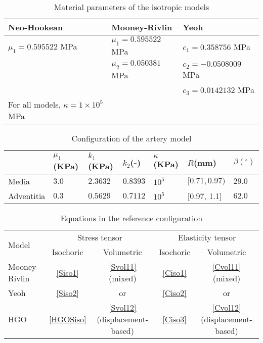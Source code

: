 \begin{table}
\centering
\caption{Material parameters of the isotropic models}
\begin{tabular} { l  l  l }
	\hline
	Neo-Hookean & Mooney-Rivlin & Yeoh \\
	\hline
	$\mu_1 = 0.595522$ MPa & $\mu_1 = 0.595522$ MPa & $c_1 = 0.358756$ MPa \\
	& $\mu_2 = 0.050381$ MPa & $c_2 = - 0.0508009$ MPa \\
	& & $c_3 = 0.0142132$ MPa \\
	\hline
	For all models, $\kappa = 1 \times 10^5 $ MPa \\
	\hline
\end{tabular}
\label{parameters}
\end{table}

\begin{table}
\centering
\caption{Configuration of the artery model}
\label{table:artery}
\begin{tabular}{ l l l l l l l}
\hline
& $\mu_1$(KPa) & $k_1$(KPa) & $k_2$(-) & $\kappa$(KPa) & $R$(mm) & $\beta(^\circ)$ \\
 \hline
 Media &   $3.0$ & $2.3632$ & $0.8393$ & $10^5$ & $[0.71, 0.97)$ & $29.0$\\
 Adventitia & $0.3$ & $0.5629$ & $0.7112$ & $10^5$ & [0.97, 1.1] & $62.0$\\
 \hline
\end{tabular}
\end{table}

\begin{table}
\centering
\caption{Equations in the reference configuration}
\label{summary}
\begin{tabular}{l c c c c} 
\toprule
\multirow{2}{*}{Model}  &  \multicolumn{2}{c}{Stress tensor} &  \multicolumn{2}{c}{Elasticity tensor} \\
\cmidrule(l){2-5}
& Isochoric  & Volumetric &  Isochoric  & Volumetric  \\
\midrule
Mooney-Rivlin  & \ref{Siso1} & \ref{Svol11} (mixed)  & \ref{Ciso1} & \ref{Cvol11} (mixed) \\
Yeoh & \ref{Siso2} &  or & \ref{Ciso2} & or \\
HGO & \ref{HGOSiso} & \ref{Svol12} (displacement-based) & \ref{Ciso3} & \ref{Cvol12} (displacement-based)\\ 
\bottomrule
\end{tabular}
\end{table}

